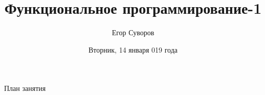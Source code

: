\documentclass[utf8,xcolor=table]{beamer}
\title[ФП-1]{Функциональное программирование-1}
\author{Егор Суворов}
\institute[НИУ ВШЭ]{Курс <<Основы программирования>>}
\date[14.01.2020]{Вторник, 14 января 019 года}
\begin{document}
\begin{frame}
\titlepage
\end{frame}

\begin{frame}{План занятия}
	\tableofcontents
\end{frame}










\end{document}
